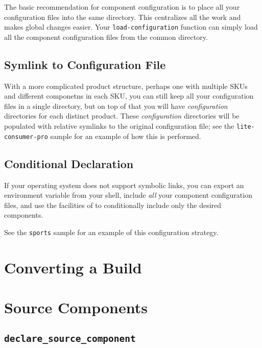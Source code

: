 The basic recommendation for \lmsbw component configuration is to
place all your configuration files into the same directory.  This
centralizes all the work and makes global changes easier.  Your
\texttt{load-configuration} function can simply load all the component
configuration files from the common directory.

\subsection{Symlink to Configuration File}

With a more complicated product structure, perhaps one with multiple
SKUs and different componetns in each SKU, you can still keep all your
configuration files in a single directory, but on top of that you will
have \emph{configuration} directories for each distinct product.
These \emph{configuration} directories will be populated with relative
symlinks to the original configuration file; see the
\texttt{lite-consumer-pro} sample for an example of how this is
performed.

\subsection{Conditional Declaration}

If your operating system does not support symbolic links, you can
export an environment variable from your shell, include \emph{all}
your component configuration files, and use the facilities of \gnumake
to conditionally include only the desired components.

See the \texttt{sports} sample for an example of this configuration
strategy.

\section{Converting a Build}

\section{Source Components}
\subsection{\texttt{declare\_source\_component}}
